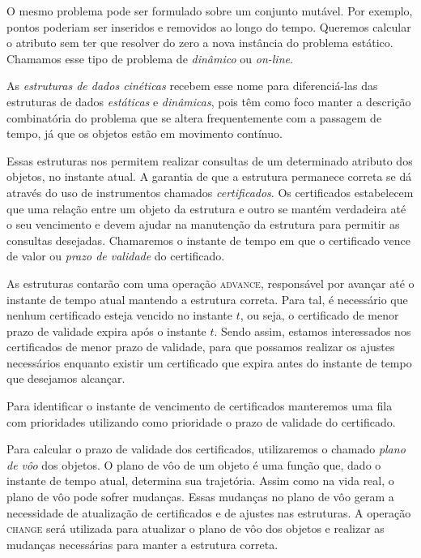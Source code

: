 O mesmo problema pode ser formulado sobre um conjunto mutável. Por exemplo,
pontos poderiam ser inseridos e removidos ao longo do tempo. Queremos calcular o
atributo sem ter que resolver do zero a nova instância do problema estático.
Chamamos esse tipo de problema de \textit{dinâmico} ou \textit{on-line}.

As \emph{estruturas de dados cinéticas} recebem esse nome para diferenciá-las
das estruturas de dados \textit{estáticas} e \textit{dinâmicas}, pois têm como
foco manter a descrição combinatória do problema que se altera frequentemente
com a passagem de tempo, já que os objetos estão em movimento contínuo.

Essas estruturas nos permitem realizar consultas de um determinado atributo dos
objetos, no instante atual. A garantia de que a estrutura permanece correta se
dá através do uso de instrumentos chamados \textit{certificados}. Os
certificados estabelecem que uma relação entre um objeto da estrutura e outro se
mantém verdadeira até o seu vencimento e devem ajudar na manutenção da estrutura
para permitir as consultas desejadas. Chamaremos o instante de tempo em que o
certificado vence de valor ou \textit{prazo de validade} do certificado.

As estruturas contarão com uma operação \textsc{advance}, responsável por
avançar até o instante de tempo atual mantendo a estrutura correta. Para tal, é
necessário que nenhum certificado esteja vencido no instante $t$, ou seja, o
certificado de menor prazo de validade expira após o instante $t$. Sendo assim,
estamos interessados nos certificados de menor prazo de validade, para que
possamos realizar os ajustes necessários enquanto existir um certificado que
expira antes do instante de tempo que desejamos alcançar.

Para identificar o instante de vencimento de certificados manteremos uma fila
com prioridades utilizando como prioridade o prazo de validade do certificado. 

Para calcular o prazo de validade dos certificados, utilizaremos o chamado
\textit{plano de vôo} dos objetos. O plano de vôo de um objeto é uma função que,
dado o instante de tempo atual, determina sua trajetória. Assim como na vida
real, o plano de vôo pode sofrer mudanças. Essas mudanças no plano de vôo geram
a necessidade de atualização de certificados e de ajustes nas estruturas. A
operação \textsc{change} será utilizada para atualizar o plano de vôo dos
objetos e realizar as mudanças necessárias para manter a estrutura correta.

